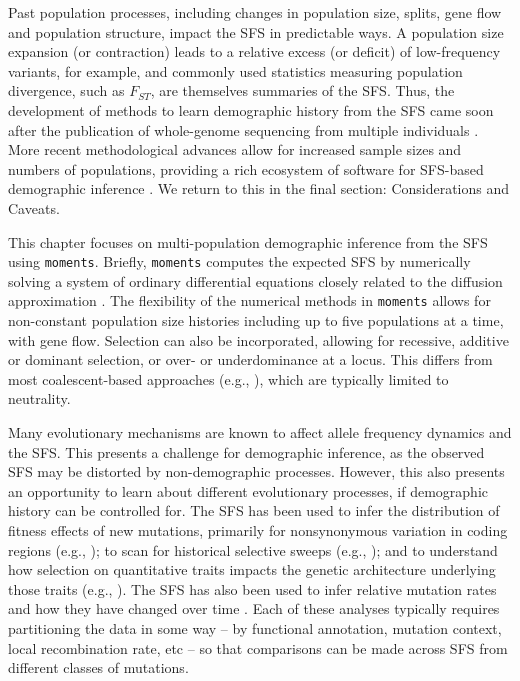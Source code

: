 \documentclass[]{article}
\newcommand{\moments}{\texttt{moments}\xspace}
\begin{document}
Past population processes, including changes in population size, splits, gene flow
and population structure, impact the SFS in predictable ways. A population size
expansion (or contraction) leads to a relative excess (or deficit) of
low-frequency variants, for example, and commonly used statistics measuring
population divergence, such as $F_{ST}$, are themselves summaries of the SFS.
Thus, the development of methods to learn demographic history from the SFS came
soon after the publication of whole-genome sequencing from multiple individuals
\cite{marth2004allele, williamson2005simultaneous}. More recent methodological
advances allow for increased sample sizes and numbers of populations, providing
a rich ecosystem of software for SFS-based demographic inference
\cite{gutenkunst2009inferring, excoffier2011fastsimcoal,
    gravel2011demographic, jouganous2017inferring, ragsdale2018genomic,
kamm2020efficiently, dilber2024faster}. We return to this in the final section:
Considerations and Caveats.

This chapter focuses on multi-population demographic inference from the SFS
using \moments \cite{jouganous2017inferring}. Briefly, \moments computes the
expected SFS by numerically solving a system of ordinary differential equations
closely related to the diffusion approximation \cite{gutenkunst2009inferring}.
The flexibility of the numerical methods in \moments allows for non-constant
population size histories including up to five populations at a time, with gene
flow. Selection can also be incorporated, allowing for recessive, additive or
dominant selection, or over- or underdominance at a locus. This differs from
most coalescent-based approaches (e.g.,
\cite{excoffier2011fastsimcoal,dewitt2021nonparametric,dilber2024faster}),
which are typically limited to neutrality.

Many evolutionary mechanisms are known to affect allele frequency dynamics and
the SFS. This presents a challenge for demographic inference, as the observed
SFS may be distorted by non-demographic processes. However, this also presents
an opportunity to learn about different evolutionary processes, if demographic
history can be controlled for. The SFS has been used to infer the distribution
of fitness effects of new mutations, primarily for nonsynonymous variation in
coding regions (e.g., \cite{eyre2006distribution, boyko2008assessing,
kim2017inference}); to scan for historical selective sweeps
(e.g., \cite{kim2002detecting, nielsen2005genomic}); and to understand how
selection on quantitative traits impacts the genetic architecture underlying
those traits (e.g., \cite{patel2024conditional, ragsdale2024archaic}). The SFS
has also been used to infer relative mutation rates and how they have changed
over time \cite{dewitt2021nonparametric}. Each of these analyses typically
requires partitioning the data in some way -- by functional annotation,
mutation context, local recombination rate, etc -- so that comparisons can be
made across SFS from different classes of mutations.
\end{document}

